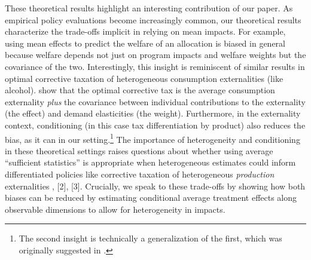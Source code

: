 \documentclass[12pt]{article}
\theoremstyle{definition}
\theoremstyle{definition}
\theoremstyle{definition}
\theoremstyle{definition}
\begin{document}

These theoretical results highlight an interesting contribution of our paper. As empirical policy evaluations become increasingly common, our theoretical results characterize the trade-offs implicit in relying on mean impacts. For example, using mean effects to predict the welfare of an allocation is biased in general because welfare depends not just on program impacts and welfare weights but the covariance of the two. Interestingly, this insight is reminiscent of similar results in optimal corrective taxation of heterogeneous consumption externalities (like alcohol). \citet{griffith2019tax} show that the optimal corrective tax is the average consumption externality \textit{plus} the covariance between individual contributions to the externality (the effect) and demand elasticities (the weight). Furthermore, in the externality context, conditioning (in this case tax differentiation by product) also reduces the bias, as it can in our setting.\footnote{The second insight is technically a generalization of the first, which was originally suggested in \citet{diamond1973consumption}.} The importance of heterogeneity and conditioning in these theoretical settings raises questions about whether using average ``sufficient statistics'' is appropriate when heterogeneous estimates could inform differentiated policies like corrective taxation of heterogeneous \textit{production} externalities \citep[][]{hollingsworth2019external,fell2021emissions,sexton2021heterogeneous}, [2], [3]. Crucially, we speak to these trade-offs by showing how both biases can be reduced by estimating conditional average treatment effects along observable dimensions to allow for heterogeneity in impacts.
\end{document}
